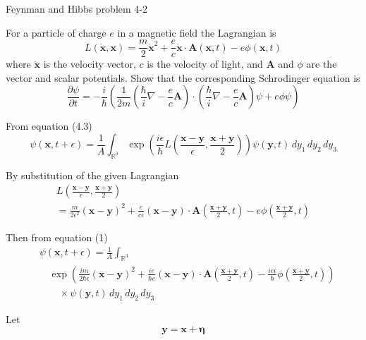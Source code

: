 \documentclass[12pt]{article}
\newcommand\INT{\int_{\mathbb R^3}}
\begin{document}
Feynman and Hibbs problem 4-2

\bigskip
For a particle of charge $e$ in a magnetic field the Lagrangian is
\begin{equation*}
L(\dot{\mathbf x},\mathbf x)=\frac{m}{2}\dot{\mathbf x}^2
+\frac{e}{c}\dot{\mathbf x}\cdot\mathbf A(\mathbf x,t)-e\phi(\mathbf x,t)
\end{equation*}
where $\dot{\mathbf x}$ is the velocity vector,
$c$ is the velocity of light, and $\mathbf A$ and $\phi$
are the vector and scalar potentials.
Show that the corresponding Schrodinger equation is
\begin{equation*}
\frac{\partial\psi}{\partial t}
=-\frac{i}{\hbar}\left(
\frac{1}{2m}\left(\frac{\hbar}{i}\nabla-\frac{e}{c}\mathbf A\right)
\cdot
\left(\frac{\hbar}{i}\nabla-\frac{e}{c}\mathbf A\right)\psi
+e\phi\psi
\right)
\end{equation*}

From equation (4.3)
\begin{equation*}
\psi(\mathbf x,t+\epsilon)=\frac{1}{A}\INT\exp\left(
\frac{i\epsilon}{\hbar}L\left(\frac{\mathbf x-\mathbf y}{\epsilon},\frac{\mathbf x+\mathbf y}{2}\right)
\right)\psi(\mathbf y,t)
\,dy_1\,dy_2\,dy_3
\tag{1}
\end{equation*}

By substitution of the given Lagrangian
\begin{multline*}
L\left(\frac{\mathbf x-\mathbf y}{\epsilon},\frac{\mathbf x+\mathbf y}{2}\right)
\\
=\frac{m}{2\epsilon^2}(\mathbf x-\mathbf y)^2
+\frac{e}{c\epsilon}(\mathbf x-\mathbf y)\cdot\mathbf A\left(\frac{\mathbf x+\mathbf y}{2},t\right)
-e\phi\left(\frac{\mathbf x+\mathbf y}{2},t\right)
\end{multline*}

Then from equation (1)
\begin{align*}
&\psi(\mathbf x,t+\epsilon)=\frac{1}{A}\INT
\\
&\quad\exp
\left(
\frac{im}{2\hbar\epsilon}(\mathbf x-\mathbf y)^2
+\frac{ie}{\hbar c}(\mathbf x-\mathbf y)\cdot\mathbf A\left(\frac{\mathbf x+\mathbf y}{2},t\right)
-\frac{ie\epsilon}{\hbar}\phi\left(\frac{\mathbf x+\mathbf y}{2},t\right)
\right)
\\
&\quad\quad{}\times\psi(\mathbf y,t)
\,dy_1\,dy_2\,dy_3
\end{align*}

Let
\begin{equation*}
\mathbf y=\mathbf x+\boldsymbol\eta
\end{equation*}
\end{document}

